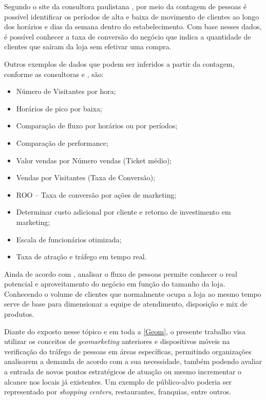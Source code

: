 Segundo o site da consultora paulistana , por meio da contagem de pessoas é possível identificar os períodos de alta e baixa de movimento de clientes ao longo dos horários e dias da semana dentro do estabelecimento. Com base nesses dados, é possível conhecer a taxa de conversão do negócio que indica a quantidade de clientes que saíram da loja sem efetivar uma compra.

Outros exemplos de dados que podem ser inferidos a partir da contagem, conforme as consultoras  e , são:

\begin{itemize}
  \item Número de Visitantes por hora;
  \item Horários de pico por baixa;
  \item Comparação de fluxo por horários ou por períodos;
  \item Comparação de performance;
  \item Valor vendas por Número vendas (Ticket médio);
  \item Vendas por Visitantes (Taxa de Conversão);
  \item ROO – Taxa de conversão por ações de marketing;
  \item Determinar custo adicional por cliente e retorno de investimento em marketing;
  \item Escala de funcionários otimizada;
  \item Taxa de atração e tráfego em tempo real.
\end{itemize}

Ainda de acordo com , analisar o fluxo de pessoas permite conhecer o real potencial e aproveitamento do negócio em função do tamanho da loja. Conhecendo o volume de clientes que normalmente ocupa a loja ao mesmo tempo serve de base para dimensionar a equipe de atendimento, disposição e mix de produtos.

Diante do exposto nesse tópico e em toda a \autoref{Geom}, o presente trabalho
visa utilizar os conceitos de \emph{geomarketing} anteriores e dispositivos móveis na
verificação do tráfego de pessoas em áreas específicas, permitindo organizações analisarem a
demanda de acordo com a sua necessidade, também podendo avaliar a entrada
de novos pontos estratégicos de atuação ou mesmo incrementar o alcance nos
locais já existentes. Um exemplo de público-alvo poderia ser representado por
\emph{shopping centers}, restaurantes, franquias, entre outros.

